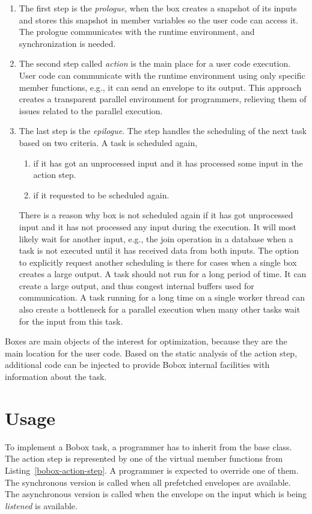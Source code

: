 \begin{enumerate}
\item The first step is the \emph{prologue}, when the box creates a snapshot of its inputs and stores this snapshot in member variables so the user code can access it. The prologue communicates with the runtime environment, and synchronization is needed.
\item The second step called \emph{action} is the main place for a user code execution. User code can communicate with the runtime environment using only specific member functions, e.g., it can send an envelope to its output. This approach creates a transparent parallel environment for programmers, relieving them of issues related to the parallel execution.
\item The last step is the \emph{epilogue}. The step handles the scheduling of the next task based on two criteria. A task is scheduled again,

\begin{enumerate}
\item if it has got an unprocessed input and it has processed some input in the action step.
\item if it requested to be scheduled again.
\end{enumerate}

There is a reason why box is not scheduled again if it has got unprocessed input and it has not processed any input during the execution. It will most likely wait for another input, e.g., the join operation in a database when a task is not executed until it has received data from both inputs. The option to explicitly request another scheduling is there for cases when a single box creates a large output. A task should not run for a long period of time. It can create a large output, and thus congest internal buffers used for communication. A task running for a long time on a single worker thread can also create a bottleneck for a parallel execution when many other tasks wait for the input from this task.

\end{enumerate}

Boxes are main objects of the interest for optimization, because they are the main location for the user code. Based on the static analysis of the action step, additional code can be injected to provide Bobox internal facilities with information about the task.

\section{Usage}
\label{bobox-usage}
To implement a Bobox task, a programmer has to inherit from the  base class. The action step is represented by one of the virtual member functions from Listing~\ref{bobox-action-step}. A programmer is expected to override one of them. The synchronous version is called when all prefetched envelopes are available. The asynchronous version is called when the envelope on the input which is being \textit{listened} is available.

